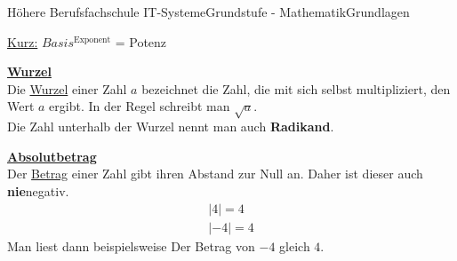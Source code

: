 \documentclass[11pt,twocolumn,oneside,openany,headings=optiontotoc,11pt,numbers=noenddot]{article}
\begin{document}
\begin{worksheet}{Höhere Berufsfachschule IT-Systeme}{Grundstufe - Mathematik}{Grundlagen}
		\begin{framed}
			\noindent
			\underline{Kurz:} \(Basis^{\text{Exponent}}\) = Potenz
		\end{framed}
		\noindent
		\underline{\textbf{Wurzel}}\\
		Die \underline{Wurzel} einer Zahl \(a\) bezeichnet die Zahl, die mit sich selbst multipliziert, den Wert \(a\) ergibt. In der Regel schreibt man \(\sqrt{a}\).\\
		Die Zahl unterhalb der Wurzel nennt man auch \textbf{Radikand}.\\
		\par\noindent
		\underline{\textbf{Absolutbetrag}}\\
		Der \underline{Betrag} einer Zahl gibt ihren \grqq{}Abstand\grqq{} zur Null an. Daher ist dieser auch \textbf{nie}negativ.
		\begin{align*}
			|4| = 4\\
			|-4| = 4
		\end{align*}
		Man liest dann beispielsweise \glqq{}Der Betrag von \(-4\) gleich \(4\)\grqq{}.

\end{worksheet}
\end{document}
